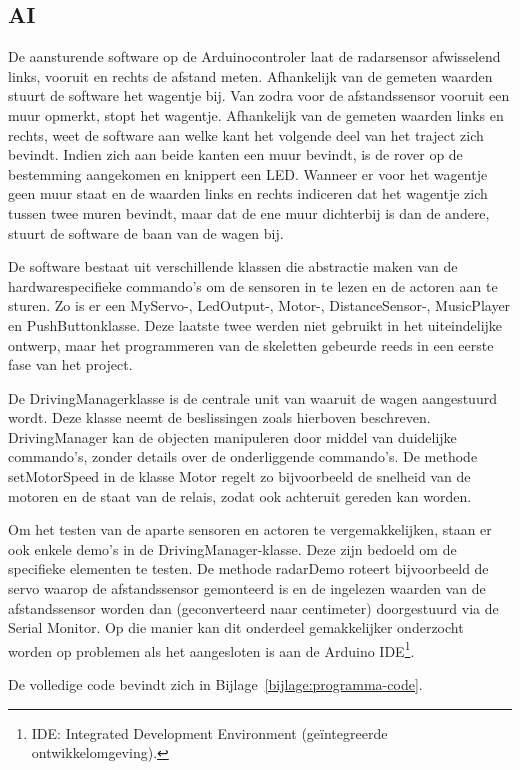  
\subsection{AI}
De aansturende software op de Arduinocontroler laat de radarsensor afwisselend links, vooruit en rechts de afstand meten. Afhankelijk van de gemeten waarden stuurt de software het wagentje bij.
Van zodra voor de afstandssensor vooruit een muur opmerkt, stopt het wagentje. Afhankelijk van de gemeten waarden links en rechts, weet de software aan welke kant het volgende deel van het traject zich bevindt.
Indien zich aan beide kanten een muur bevindt, is de rover op de bestemming aangekomen en knippert een LED.
Wanneer er voor het wagentje geen muur staat en de waarden links en rechts indiceren dat het wagentje zich tussen twee muren bevindt, maar dat de ene muur dichterbij is dan de andere, stuurt de software de baan van de wagen bij.

De software bestaat uit verschillende klassen die abstractie maken van de hardwarespecifieke commando's om de sensoren in te lezen en de actoren aan te sturen.
Zo is er een MyServo-, LedOutput-, Motor-, DistanceSensor-, MusicPlayer en PushButtonklasse. Deze laatste twee werden niet gebruikt in het uiteindelijke ontwerp, maar het programmeren van de skeletten gebeurde reeds in een eerste fase van het project.

De DrivingManagerklasse is de centrale unit van waaruit de wagen aangestuurd wordt. Deze klasse neemt de beslissingen zoals hierboven beschreven. 
DrivingManager kan de objecten manipuleren door middel van duidelijke commando's, zonder details over de onderliggende commando's. 
De methode setMotorSpeed in de klasse Motor regelt zo bijvoorbeeld de snelheid van de motoren en de staat van de relais, zodat ook achteruit gereden kan worden.

Om het testen van de aparte sensoren en actoren te vergemakkelijken, staan er ook enkele demo's in de DrivingManager-klasse. Deze zijn bedoeld om de specifieke elementen te testen. 
De methode radarDemo roteert bijvoorbeeld de servo waarop de afstandssensor gemonteerd is en de ingelezen waarden van de afstandssensor worden dan (geconverteerd naar centimeter) doorgestuurd via de Serial Monitor. Op die manier kan dit onderdeel gemakkelijker onderzocht worden op problemen als het aangesloten is aan de Arduino IDE\footnote{IDE: Integrated Development Environment (geïntegreerde ontwikkelomgeving).}.

De volledige code bevindt zich in Bijlage~\ref{bijlage:programma-code}.